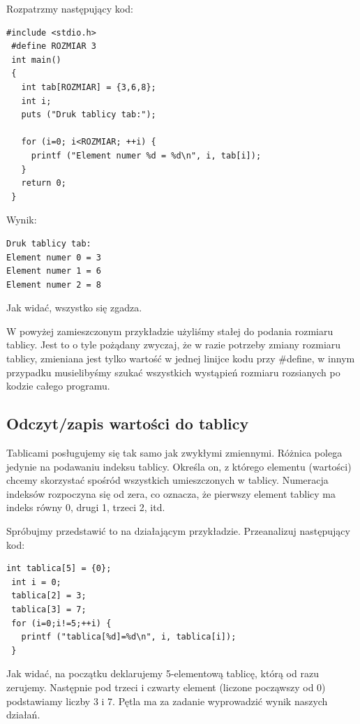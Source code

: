\documentclass[a4paper,12pt]{article}
\begin{document}
Rozpatrzmy następujący kod:
\begin{lstlisting}[caption=Printowanie tablicy, captionpos=t, label=src:sqrt, frame=lBTr, frameround=ffff, captionpos=b ]
 #include <stdio.h>
 #define ROZMIAR 3
 int main()
 {
   int tab[ROZMIAR] = {3,6,8};
   int i;
   puts ("Druk tablicy tab:");
 
   for (i=0; i<ROZMIAR; ++i) {
     printf ("Element numer %d = %d\n", i, tab[i]);
   }
   return 0;
 }
\end{lstlisting}

Wynik:
\begin{lstlisting}[caption=Wyniki, captionpos=t, label=src:sqrt, frame=lBTr, frameround=ffff, captionpos=b ]
Druk tablicy tab:
Element numer 0 = 3
Element numer 1 = 6
Element numer 2 = 8
\end{lstlisting}
Jak widać, wszystko się zgadza.

W powyżej zamieszczonym przykładzie użyliśmy stałej do podania rozmiaru tablicy. Jest to o tyle pożądany zwyczaj, że w razie potrzeby zmiany rozmiaru tablicy, zmieniana jest tylko wartość w jednej linijce kodu przy #define, w innym przypadku musielibyśmy szukać wszystkich wystąpień rozmiaru rozsianych po kodzie całego programu.

\subsection*{Odczyt/zapis wartości do tablicy}
Tablicami posługujemy się tak samo jak zwykłymi zmiennymi. Różnica polega jedynie na podawaniu indeksu tablicy. Określa on, z którego elementu (wartości) chcemy skorzystać spośród wszystkich umieszczonych w tablicy. Numeracja indeksów rozpoczyna się od zera, co oznacza, że pierwszy element tablicy ma indeks równy 0, drugi 1, trzeci 2, itd.

Spróbujmy przedstawić to na działającym przykładzie. Przeanalizuj następujący kod:

\begin{lstlisting}[caption=Fragment, captionpos=t, label=src:sqrt, frame=lBTr, frameround=ffff, captionpos=b ]
 int tablica[5] = {0};
 int i = 0;
 tablica[2] = 3;
 tablica[3] = 7;
 for (i=0;i!=5;++i) {
   printf ("tablica[%d]=%d\n", i, tablica[i]);
 }

\end{lstlisting}
Jak widać, na początku deklarujemy 5-elementową tablicę, którą od razu zerujemy. Następnie pod trzeci i czwarty element (liczone począwszy od 0) podstawiamy liczby 3 i 7. Pętla ma za zadanie wyprowadzić wynik naszych działań.
\end{document}
